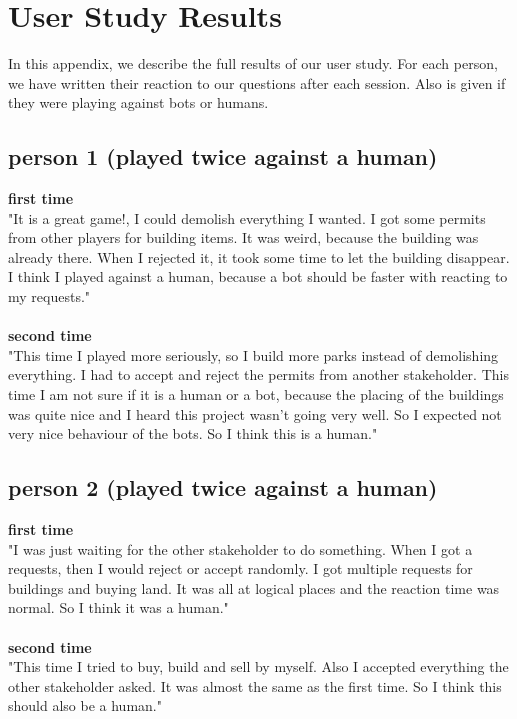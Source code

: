 \section{User Study Results}
In this appendix, we describe the full results of our user study. For each person, we have written their reaction to our questions after each session. Also is given if they were playing against bots or humans.
\subsection{person 1 (played twice against a human)}
\textbf{first time}\\
"It is a great game!, I could demolish everything I wanted. I got some permits from other players for building items. It was weird, because the building was already there. When I rejected it, it took some time to let the building disappear. I think I played against a human, because a bot should be faster with reacting to my requests."
\\ \\
\textbf{second time}\\
"This time I played more seriously, so I build more parks instead of demolishing everything. I had to accept and reject the permits from another stakeholder. This time I am not sure if it is a human or a bot, because the placing of the buildings was quite nice and I heard this project wasn't going very well. So I expected not very nice behaviour of the bots. So I think this is a human."

\subsection{person 2 (played twice against a human)}
\textbf{first time}\\
"I was just waiting for the other stakeholder to do something. When I got a requests, then I would reject or accept randomly. I got multiple requests for buildings and buying land. It was all at logical places and the reaction time was normal. So I think it was a human."
\\ \\
\textbf{second time}\\
"This time I tried to buy, build and sell by myself. Also I accepted everything the other stakeholder asked. It was almost the same as the first time. So I think this should also be a human."

